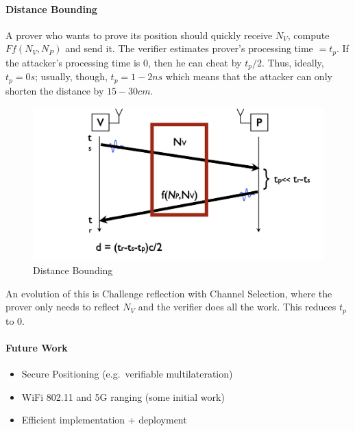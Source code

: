 \paragraph{Distance Bounding}
A prover who wants to prove its position should quickly receive $N_V$, compute $Ff(N_V,N_P)$ and send it.
The verifier estimates prover's processing time $=t_p$. If the attacker's processing time is $0$, then he can cheat by $t_p/2$. Thus, ideally, $t_p=0s$; usually, though, $t_p=1-2ns$ which means that the attacker can only shorten the distance by $15-30cm$.
\begin{figure}[h]
	\centering
	\includegraphics[scale=0.4]{images/5-dist-bounding.png}
	\caption{Distance Bounding}%
	\label{fig:dist_bounding}
\end{figure}
An evolution of this is Challenge reflection with Channel Selection, where the prover only needs to reflect $N_V$ and the verifier does all the work. This reduces $t_p$ to $0$.

\paragraph{Future Work}
\begin{itemize}
	\item Secure Positioning (e.g.\ verifiable multilateration)
	\item WiFi 802.11 and 5G ranging (some initial work)
	\item Efficient implementation + deployment
\end{itemize}
